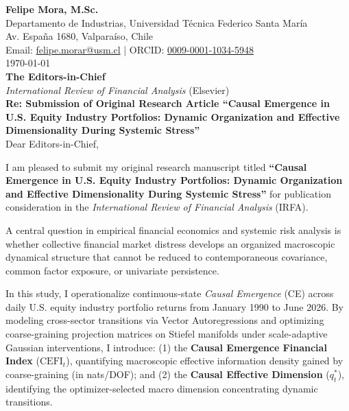 \documentclass[10pt]{article}
\begin{document}
\pagestyle{empty}

\noindent
\textbf{Felipe Mora, M.Sc.} \\
Departamento de Industrias, Universidad Técnica Federico Santa María \\
Av. España 1680, Valparaíso, Chile \\
Email: \href{mailto:felipe.morar@usm.cl}{felipe.morar@usm.cl} \quad | \quad ORCID: \href{https://orcid.org/0009-0001-1034-5948}{0009-0001-1034-5948} \\[2.5mm]

\noindent
\today \\[2mm]

\noindent
\textbf{The Editors-in-Chief} \\
\emph{International Review of Financial Analysis} \quad (Elsevier) \\[2mm]

\noindent
\textbf{Re: Submission of Original Research Article ``Causal Emergence in U.S. Equity Industry Portfolios: Dynamic Organization and Effective Dimensionality During Systemic Stress''} \\[2mm]

\noindent
Dear Editors-in-Chief,

\vspace{1mm}
\noindent
I am pleased to submit my original research manuscript titled \textbf{``Causal Emergence in U.S. Equity Industry Portfolios: Dynamic Organization and Effective Dimensionality During Systemic Stress''} for publication consideration in the \emph{International Review of Financial Analysis} (IRFA).

\vspace{1mm}
\noindent
A central question in empirical financial economics and systemic risk analysis is whether collective financial market distress develops an organized macroscopic dynamical structure that cannot be reduced to contemporaneous covariance, common factor exposure, or univariate persistence.

\vspace{1mm}
\noindent
In this study, I operationalize continuous-state \emph{Causal Emergence} (CE) across daily U.S. equity industry portfolio returns from January 1990 to June 2026. By modeling cross-sector transitions via Vector Autoregressions and optimizing coarse-graining projection matrices on Stiefel manifolds under scale-adaptive Gaussian interventions, I introduce: (1) the \textbf{Causal Emergence Financial Index} ($\mathrm{CEFI}_t$), quantifying macroscopic effective information density gained by coarse-graining (in nats/DOF); and (2) the \textbf{Causal Effective Dimension} ($q_t^*$), identifying the optimizer-selected macro dimension concentrating dynamic transitions.
\end{document}
